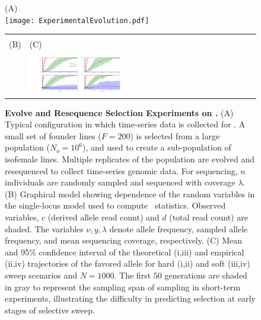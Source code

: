\begin{figure}[H]
		\centering
(A)\\
	\texttt{[image: ExperimentalEvolution.pdf]}\\

\begin{tabular}{l|l}
		\hline\\
		(B) &(C)\\
		\raisebox{0.1in}{
\texttt{[image: HMMGM.pdf]}}
& 	\includegraphics[trim=0in 0.in 0in 
0.0in,clip,width=0.45\textwidth]{AF.pdf}	

\end{tabular}
\hspace{-1in}
\caption{{\bf Evolve and Resequence Selection Experiments on \dmel.}
  (A) Typical configuration in which time-series data is collected for
  \dmel. A small set of founder lines ($F=200$) is selected from a
  large population ($N_o=10^{6}$), and used to create a sub-population
  of isofemale lines. Multiple replicates of the population are
  evolved and resequenced to collect time-series genomic data. For
  sequencing, $n$ individuals are randomly sampled and sequenced with
  coverage $\lambda$.  (B) Graphical model showing dependence of the
  random variables in the single-locus model used to compute \comale\
  statistics. Observed variables, $c$ (derived allele read count) and
  $d$ (total read count) are shaded. The variables $\nu,y,\lambda$
  denote allele frequency, sampled allele frequency, and mean
  sequencing coverage, respectively. (C) Mean and 95\% confidence
  interval of the theoretical (i,iii) and empirical (ii,iv)
  trajectories of the favored allele for hard (i,ii) and soft (iii,iv)
  sweep scenarios and $N=1000$.  The first $50$ generations are shaded
  in gray to represent the sampling span of sampling in short-term
  experiments, illustrating the difficulty in predicting selection at
  early stages of selective sweep.  }
\label{fig:1}
\end{figure}



